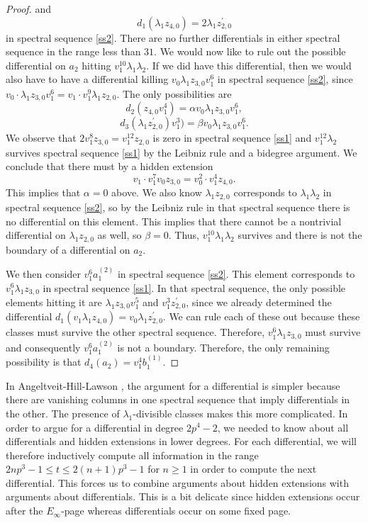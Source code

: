\begin{proof}
and 
\[ d_1(\lambda_1z_{4,0})=2\lambda_1z_{2,0}^{\prime}\]
in spectral sequence \eqref{ss2}. There are no further differentials in either spectral sequence in the range less than $31$. We would now like to rule out the possible differential on $a_2$ hitting $v_1^{10}\lambda_1\lambda_2$. 
If we did have this differential, then we would also have to have a differential killing $v_0\lambda_1z_{3,0}v_1^{6}$ in spectral sequence \eqref{ss2}, since $v_0\cdot \lambda_1z_{3,0}v_1^6=v_1\cdot v_1^9\lambda_1z_{2,0}$. 
The only possibilities are 
\[d_2(z_{4,0}v_1^4) = \alpha v_0\lambda_1z_{3,0}v_1^{6}, \]
\[ d_3(\lambda_1z_{2,0}^{\prime})v_1^3) = \beta v_0\lambda_1z_{3,0}v_1^{6}.\]
We observe that $2v_1^8z_{3,0}=v_1^{12}z_{2,0}$ is zero in spectral sequence \eqref{ss1} and $v_1^{12}\lambda_2$ survives spectral sequence \eqref{ss1} by the Leibniz rule and a bidegree argument. We conclude that there must by a hidden extension 
\[ v_1\cdot v_1^7v_0z_{3,0}=v_0^2\cdot v_1^4z_{4,0}.\]
This implies that $\alpha=0$ above. We also know $\lambda_1z_{2,0}$ corresponds to $\lambda_1\lambda_2$ in spectral sequence \eqref{ss2}, so by the Leibniz rule in that spectral sequence there is no differential on this element. This implies that there cannot be a nontrivial differential on $\lambda_1z_{2,0}$ as well, so $\beta=0$. 
Thus, $v_1^{10}\lambda_1\lambda_2$ survives and there is not the boundary of a differential on $a_2$. 

We then consider $v_1^6a_1^{(2)}$ in spectral sequence \eqref{ss2}. This element corresponds to $v_1^6\lambda_1z_{3,0}$ in spectral sequence \eqref{ss1}. In that spectral sequence, the only possible elements hitting it are $\lambda_1z_{3,0}v_1^5$ and $v_1^3z_{2,0}^{\prime}$, since we already determined the differential $d_1(v_1\lambda_1z_{4,0})=v_0\lambda_1z_{2,0}^{\prime}$. We can rule each of these out because these classes must survive the other spectral sequence. Therefore, $v_1^6\lambda_1z_{3,0}$ must survive and consequently $v_1^6a_1^{(2)}$ is not a boundary. Therefore, the only remaining possibility is that $d_{4}(a_2)=v_1^4b_1^{(1)}$. 
\end{proof}
\begin{rem}
In Angeltveit-Hill-Lawson \cite{AHL}, the argument for a differential is simpler because there are vanishing columns in one spectral sequence that imply differentials in the other. The presence of $\lambda_1$-divisible classes makes this more complicated. In order to argue for a differential in degree $2p^4-2$, we needed to know about all differentials and hidden extensions in lower degrees. For each differential, we will therefore inductively compute all information in the range $2np^{3}-1\le t \le 2(n+1)p^{3}-1$ for $n\ge 1$ in order to compute the next differential. This forces us to combine arguments about hidden extensions with arguments about differentials. This is a bit delicate since hidden extensions occur after the $E_{\infty}$-page whereas differentials occur on some fixed page. 
\end{rem}

